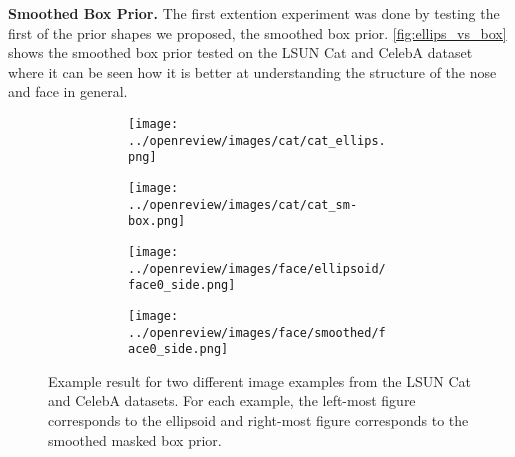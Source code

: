 \textbf{Smoothed Box Prior.}
The first extention experiment was done by testing the first of the prior shapes we proposed, the smoothed box prior. \autoref{fig:ellips_vs_box} shows the smoothed box prior tested on the LSUN Cat and CelebA dataset where it can be seen how it is better at understanding the structure of the nose and face in general.
\begin{figure}[!htb]
    \centering
    \begin{subfigure}{0.40\textwidth}
        \begin{subfigure}{0.48\textwidth}
            \centering
            \texttt{[image: ../openreview/images/cat/cat\_ellips.png]}
        \end{subfigure}
        \begin{subfigure}{0.48\textwidth}
            \centering
            \texttt{[image: ../openreview/images/cat/cat\_sm-box.png]}
        \end{subfigure}
        \caption{}
    \end{subfigure}
    \begin{subfigure}{0.40\textwidth}
        \begin{subfigure}{0.48\textwidth}
            \centering
            \texttt{[image: ../openreview/images/face/ellipsoid/face0\_side.png]}
        \end{subfigure}
        \begin{subfigure}{0.48\textwidth}
            \centering
            \texttt{[image: ../openreview/images/face/smoothed/face0\_side.png]}
        \end{subfigure}
        \caption{}
    \end{subfigure}
    \caption{Example result for two different image examples from the LSUN Cat and CelebA datasets. For each example, the left-most figure corresponds to the ellipsoid and right-most figure corresponds to the smoothed masked box prior.}
    \label{fig:ellips_vs_box}
\end{figure}

